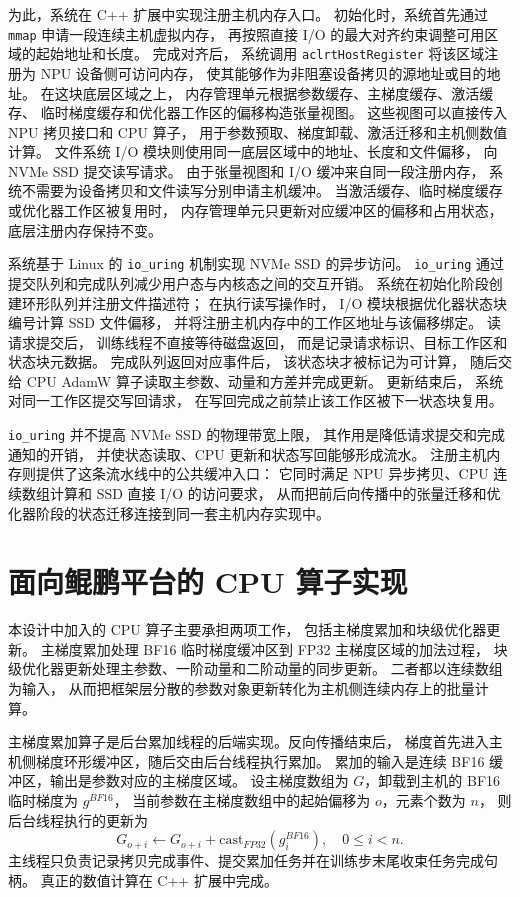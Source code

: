 \documentclass[bachelor,openany,oneside,color,AutoFakeBold=true]{buaathesis}
\begin{document}
为此，系统在 C++ 扩展中实现注册主机内存入口。
初始化时，系统首先通过 \texttt{mmap} 申请一段连续主机虚拟内存，
再按照直接 I/O 的最大对齐约束调整可用区域的起始地址和长度。
完成对齐后，
系统调用 \texttt{aclrtHostRegister} 将该区域注册为 NPU 设备侧可访问内存，
使其能够作为非阻塞设备拷贝的源地址或目的地址。
在这块底层区域之上，
内存管理单元根据参数缓存、主梯度缓存、激活缓存、
临时梯度缓存和优化器工作区的偏移构造张量视图。
这些视图可以直接传入 NPU 拷贝接口和 CPU 算子，
用于参数预取、梯度卸载、激活迁移和主机侧数值计算。
文件系统 I/O 模块则使用同一底层区域中的地址、长度和文件偏移，
向 NVMe SSD 提交读写请求。
由于张量视图和 I/O 缓冲来自同一段注册内存，
系统不需要为设备拷贝和文件读写分别申请主机缓冲。
当激活缓存、临时梯度缓存或优化器工作区被复用时，
内存管理单元只更新对应缓冲区的偏移和占用状态，
底层注册内存保持不变。

系统基于 Linux 的 \texttt{io\_uring} 机制实现 NVMe SSD 的异步访问。
\texttt{io\_uring} 通过提交队列和完成队列减少用户态与内核态之间的交互开销。
系统在初始化阶段创建环形队列并注册文件描述符；
在执行读写操作时，
I/O 模块根据优化器状态块编号计算 SSD 文件偏移，
并将注册主机内存中的工作区地址与该偏移绑定。
读请求提交后，
训练线程不直接等待磁盘返回，
而是记录请求标识、目标工作区和状态块元数据。
完成队列返回对应事件后，
该状态块才被标记为可计算，
随后交给 CPU AdamW 算子读取主参数、动量和方差并完成更新。
更新结束后，
系统对同一工作区提交写回请求，
在写回完成之前禁止该工作区被下一状态块复用。

\texttt{io\_uring} 并不提高 NVMe SSD 的物理带宽上限，
其作用是降低请求提交和完成通知的开销，
并使状态读取、CPU 更新和状态写回能够形成流水。
注册主机内存则提供了这条流水线中的公共缓冲入口：
它同时满足 NPU 异步拷贝、CPU 连续数组计算和 SSD 直接 I/O 的访问要求，
从而把前后向传播中的张量迁移和优化器阶段的状态迁移连接到同一套主机内存实现中。

\section{面向鲲鹏平台的 CPU 算子实现}
本设计中加入的 CPU 算子主要承担两项工作，
包括主梯度累加和块级优化器更新。
主梯度累加处理 BF16 临时梯度缓冲区到 FP32 主梯度区域的加法过程，
块级优化器更新处理主参数、一阶动量和二阶动量的同步更新。
二者都以连续数组为输入，
从而把框架层分散的参数对象更新转化为主机侧连续内存上的批量计算。

主梯度累加算子是后台累加线程的后端实现。反向传播结束后，
梯度首先进入主机侧梯度环形缓冲区，随后交由后台线程执行累加。
累加的输入是连续 BF16 缓冲区，输出是参数对应的主梯度区域。
设主梯度数组为 $G$，卸载到主机的 BF16 临时梯度为 $g^{BF16}$，
当前参数在主梯度数组中的起始偏移为 $o$，元素个数为 $n$，
则后台线程执行的更新为
\[
G_{o+i} \leftarrow G_{o+i} + \mathrm{cast}_{FP32}(g^{BF16}_i),
\quad 0 \le i < n .
\]
主线程只负责记录拷贝完成事件、提交累加任务并在训练步末尾收束任务完成句柄。
真正的数值计算在 C++ 扩展中完成。
\end{document}
